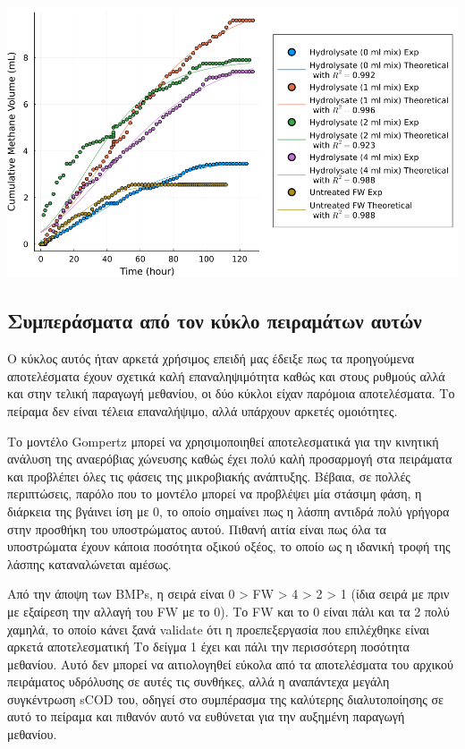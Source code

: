 \documentclass[11pt]{article}
\begin{document}
\begin{center}
\includegraphics[width=.9\linewidth]{../plots/BMPs/methane_s1_r2_comp.png}
\end{center}

\subsection{Συμπεράσματα από τον κύκλο πειραμάτων αυτών}
\label{sec:orgecb442e}
Ο κύκλος αυτός ήταν αρκετά χρήσιμος επειδή μας έδειξε πως τα προηγούμενα αποτελέσματα έχουν σχετικά καλή επαναληψιμότητα καθώς και στους ρυθμούς αλλά και στην τελική παραγωγή μεθανίου, οι δύο κύκλοι είχαν παρόμοια αποτελέσματα. Το πείραμα δεν είναι τέλεια επαναλήψιμο, αλλά υπάρχουν αρκετές ομοιότητες.

Το μοντέλο Gompertz μπορεί να χρησιμοποιηθεί αποτελεσματικά για την κινητική ανάλυση της αναερόβιας χώνευσης καθώς έχει πολύ καλή προσαρμογή στα πειράματα και προβλέπει όλες τις φάσεις της μικροβιακής ανάπτυξης. Βέβαια, σε πολλές περιπτώσεις, παρόλο που το μοντέλο μπορεί να προβλέψει μία στάσιμη φάση, η διάρκεια της βγάινει ίση με 0, το οποίο σημαίνει πως η λάσπη αντιδρά πολύ γρήγορα στην προσθήκη του υποστρώματος αυτού. Πιθανή αιτία είναι πως όλα τα υποστρώματα έχουν κάποια ποσότητα οξικού οξέος, το οποίο ως η ιδανική τροφή της λάσπης καταναλώνεται αμέσως.

Από την άποψη των BMPs, η σειρά είναι 0 > FW > 4 > 2 > 1 (ίδια σειρά με πριν με εξαίρεση την αλλαγή του FW με το 0). Το FW και το 0 είναι πάλι και τα 2 πολύ χαμηλά, το οποίο κάνει ξανά validate ότι η προεπεξεργασία που επιλέχθηκε είναι αρκετά αποτελεσματική Το δείγμα 1 έχει και πάλι την περισσότερη ποσότητα μεθανίου. Αυτό δεν μπορεί να αιτιολογηθεί εύκολα από τα αποτελέσματα του αρχικού πειράματος υδρόλυσης σε αυτές τις συνθήκες, αλλά η αναπάντεχα μεγάλη συγκέντρωση sCOD του, οδηγεί στο συμπέρασμα της καλύτερης διαλυτοποίησης σε αυτό το πείραμα και πιθανόν αυτό να ευθύνεται για την αυξημένη παραγωγή μεθανίου.
\end{document}
